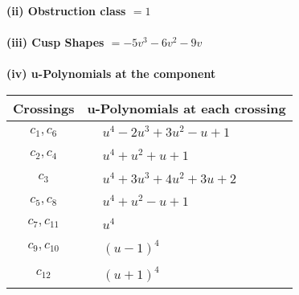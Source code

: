 \documentclass[1p]{elsarticle_modified}
\theoremstyle{definition}
\begin{document}
\flushleft \textbf{(ii) Obstruction class $= 1$}\\~\\
\flushleft \textbf{(iii) Cusp Shapes $= -5 v^3-6 v^2-9 v$}\\~\\
\newpage\renewcommand{\arraystretch}{1}
\flushleft \textbf{(iv) u-Polynomials at the component}\newline \\
\begin{tabular}{m{50pt}|m{274pt}}
Crossings & \hspace{64pt}u-Polynomials at each crossing \\
\hline $$\begin{aligned}c_{1},c_{6}\end{aligned}$$&$\begin{aligned}
&u^4-2 u^3+3 u^2- u+1
\end{aligned}$\\
\hline $$\begin{aligned}c_{2},c_{4}\end{aligned}$$&$\begin{aligned}
&u^4+u^2+u+1
\end{aligned}$\\
\hline $$\begin{aligned}c_{3}\end{aligned}$$&$\begin{aligned}
&u^4+3 u^3+4 u^2+3 u+2
\end{aligned}$\\
\hline $$\begin{aligned}c_{5},c_{8}\end{aligned}$$&$\begin{aligned}
&u^4+u^2- u+1
\end{aligned}$\\
\hline $$\begin{aligned}c_{7},c_{11}\end{aligned}$$&$\begin{aligned}
&u^4
\end{aligned}$\\
\hline $$\begin{aligned}c_{9},c_{10}\end{aligned}$$&$\begin{aligned}
&(u-1)^4
\end{aligned}$\\
\hline $$\begin{aligned}c_{12}\end{aligned}$$&$\begin{aligned}
&(u+1)^4
\end{aligned}$\\
\hline
\end{tabular}\\~\\
\end{document}

